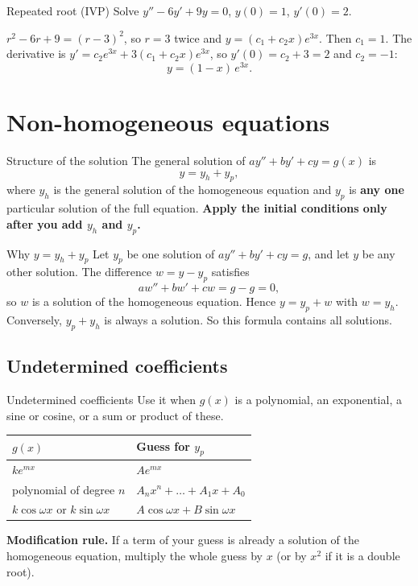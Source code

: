 \begin{examplebox}{Repeated root (IVP)}
Solve $y'' - 6y' + 9y = 0$, \; $y(0)=1$, \; $y'(0)=2$.

$r^2 - 6r + 9 = (r-3)^2$, so $r=3$ twice and $y = (c_1 + c_2x)e^{3x}$. Then $c_1 = 1$. The derivative is $y' = c_2e^{3x} + 3(c_1 + c_2x)e^{3x}$, so $y'(0) = c_2 + 3 = 2$ and $c_2 = -1$:
\[ y = (1 - x)\,e^{3x}. \]
\end{examplebox}

\section{Non-homogeneous equations}

\begin{defbox}{Structure of the solution}
The general solution of $ay'' + by' + cy = g(x)$ is
\[ y = y_h + y_p, \]
where $y_h$ is the general solution of the homogeneous equation and $y_p$ is \textbf{any one} particular solution of the full equation. \textbf{Apply the initial conditions only after you add $y_h$ and $y_p$.}
\end{defbox}

\begin{derivbox}{Why $y = y_h + y_p$}
Let $y_p$ be one solution of $ay''+by'+cy = g$, and let $y$ be any other solution. The difference $w = y - y_p$ satisfies
\[ aw'' + bw' + cw = g - g = 0, \]
so $w$ is a solution of the homogeneous equation. Hence $y = y_p + w$ with $w = y_h$. Conversely, $y_p + y_h$ is always a solution. So this formula contains all solutions.
\end{derivbox}

\subsection{Undetermined coefficients}

\begin{methodbox}{Undetermined coefficients}
Use it when $g(x)$ is a polynomial, an exponential, a sine or cosine, or a sum or product of these.
\begin{center}
\begin{tabular}{@{}ll@{}}
\toprule
$g(x)$ & Guess for $y_p$ \\
\midrule
$ke^{mx}$ & $Ae^{mx}$ \\
polynomial of degree $n$ & $A_nx^n + \dots + A_1x + A_0$ \\
$k\cos\omega x$ or $k\sin\omega x$ & $A\cos\omega x + B\sin\omega x$ \\
\bottomrule
\end{tabular}
\end{center}
\textbf{Modification rule.} If a term of your guess is already a solution of the homogeneous equation, multiply the whole guess by $x$ (or by $x^2$ if it is a double root).
\end{methodbox}

